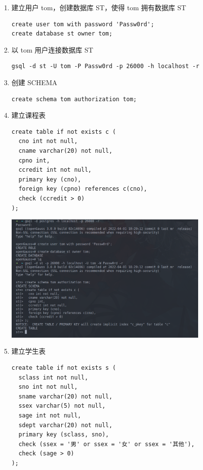 \documentclass[hyperref,UTF8,12pt,a4paper]{ctexart}
\begin{document}
\begin{enumerate}
\item 建立用户 tom，创建数据库 ST，使得 tom 拥有数据库 ST %

\begin{verbatim}
create user tom with password 'Passw0rd';
create database st owner tom;
\end{verbatim}

\item 以 tom 用户连接数据库 ST %

\begin{verbatim}
gsql -d st -U tom -P Passw0rd -p 26000 -h localhost -r
\end{verbatim}

\item 创建 SCHEMA %

\begin{verbatim}
create schema tom authorization tom;
\end{verbatim}

\item 建立课程表

\begin{verbatim}
create table if not exists c (
  cno int not null,
  cname varchar(20) not null,
  cpno int,
  ccredit int not null,
  primary key (cno),
  foreign key (cpno) references c(cno),
  check (ccredit > 0)
);
\end{verbatim}

\begin{center}
\includegraphics[width=0.8\textwidth]{1-4.png}
\end{center}

\item 建立学生表

\begin{verbatim}
create table if not exists s (
  sclass int not null,
  sno int not null,
  sname varchar(20) not null,
  ssex varchar(5) not null,
  sage int not null,
  sdept varchar(20) not null,
  primary key (sclass, sno),
  check (ssex = '男' or ssex = '女' or ssex = '其他'),
  check (sage > 0)
);
\end{verbatim}


\end{enumerate}
\end{document}
